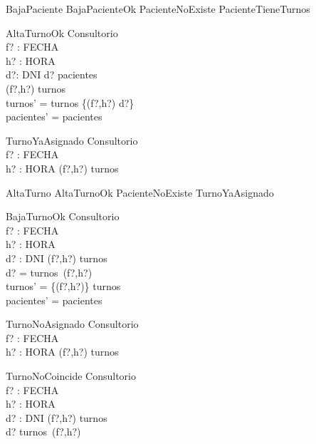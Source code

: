 \begin{zed}
BajaPaciente  BajaPacienteOk \lor PacienteNoExiste \lor PacienteTieneTurnos
\end{zed}

\begin{schema}{AltaTurnoOk}
\Delta Consultorio \\
f? : FECHA \\
h? : HORA \\
d?: DNI
\where
d? \in \dom pacientes \\
(f?,h?) \notin \dom turnos \\
turnos' = turnos  \cup \{(f?,h?) \mapsto d?\} \\
pacientes' = pacientes
\end{schema}

\begin{schema}{TurnoYaAsignado}
\Xi Consultorio \\
f? : FECHA \\
h? : HORA
\where
(f?,h?) \in \dom turnos
\end{schema}

\begin{zed}
AltaTurno  AltaTurnoOk \lor PacienteNoExiste \lor TurnoYaAsignado
\end{zed}

\begin{schema}{BajaTurnoOk}
\Delta Consultorio \\
f? : FECHA \\
h? : HORA \\
d? : DNI
\where
(f?,h?) \in \dom turnos \\
d? = turnos\ (f?,h?) \\
turnos' = \{(f?,h?)\} \ndres turnos \\
pacientes' = pacientes
\end{schema}

\begin{schema}{TurnoNoAsignado}
\Xi Consultorio \\
f? : FECHA \\
h? : HORA
\where
(f?,h?) \notin \dom turnos
\end{schema}

\begin{schema}{TurnoNoCoincide}
\Xi Consultorio \\
f? : FECHA \\
h? : HORA \\
d? : DNI
\where
(f?,h?) \in \dom turnos \\
d? \neq turnos\ (f?,h?)
\end{schema}

